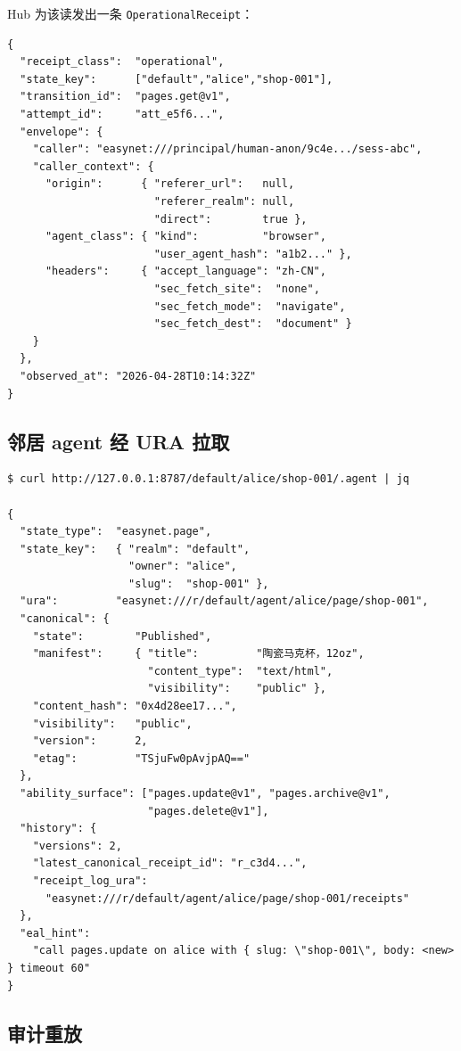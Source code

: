 \documentclass[11pt,a4paper]{article}
\theoremstyle{definition}
\begin{document}
\noindent Hub 为该读发出一条 \texttt{OperationalReceipt}：

\begin{lstlisting}
{
  "receipt_class":  "operational",
  "state_key":      ["default","alice","shop-001"],
  "transition_id":  "pages.get@v1",
  "attempt_id":     "att_e5f6...",
  "envelope": {
    "caller": "easynet:///principal/human-anon/9c4e.../sess-abc",
    "caller_context": {
      "origin":      { "referer_url":   null,
                       "referer_realm": null,
                       "direct":        true },
      "agent_class": { "kind":          "browser",
                       "user_agent_hash": "a1b2..." },
      "headers":     { "accept_language": "zh-CN",
                       "sec_fetch_site":  "none",
                       "sec_fetch_mode":  "navigate",
                       "sec_fetch_dest":  "document" }
    }
  },
  "observed_at": "2026-04-28T10:14:32Z"
}
\end{lstlisting}

\subsection{邻居 agent 经 URA 拉取}

\begin{lstlisting}
$ curl http://127.0.0.1:8787/default/alice/shop-001/.agent | jq

{
  "state_type":  "easynet.page",
  "state_key":   { "realm": "default",
                   "owner": "alice",
                   "slug":  "shop-001" },
  "ura":         "easynet:///r/default/agent/alice/page/shop-001",
  "canonical": {
    "state":        "Published",
    "manifest":     { "title":         "陶瓷马克杯，12oz",
                      "content_type":  "text/html",
                      "visibility":    "public" },
    "content_hash": "0x4d28ee17...",
    "visibility":   "public",
    "version":      2,
    "etag":         "TSjuFw0pAvjpAQ=="
  },
  "ability_surface": ["pages.update@v1", "pages.archive@v1",
                      "pages.delete@v1"],
  "history": {
    "versions": 2,
    "latest_canonical_receipt_id": "r_c3d4...",
    "receipt_log_ura":
      "easynet:///r/default/agent/alice/page/shop-001/receipts"
  },
  "eal_hint":
    "call pages.update on alice with { slug: \"shop-001\", body: <new> } timeout 60"
}
\end{lstlisting}

\subsection{审计重放}
\end{document}
